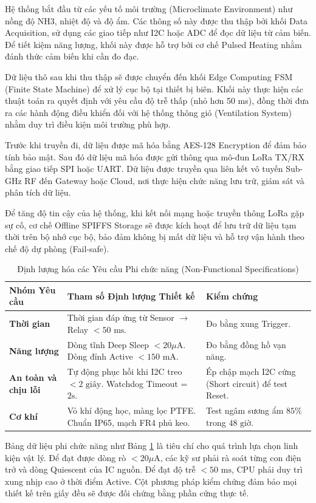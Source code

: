 Hệ thống bắt đầu từ các yếu tố môi trường (Microclimate Environment) như nồng độ NH3, nhiệt độ và độ ẩm. Các thông số này được thu thập bởi khối Data Acquisition, sử dụng các giao tiếp như I2C hoặc ADC để đọc dữ liệu từ cảm biến. Để tiết kiệm năng lượng, khối này được hỗ trợ bởi cơ chế Pulsed Heating nhằm đánh thức cảm biến khi cần đo đạc.

Dữ liệu thô sau khi thu thập sẽ được chuyển đến khối Edge Computing FSM (Finite State Machine) để xử lý cục bộ tại thiết bị biên. Khối này thực hiện các thuật toán ra quyết định với yêu cầu độ trễ thấp (nhỏ hơn 50 ms), đồng thời đưa ra các hành động điều khiển đối với hệ thống thông gió (Ventilation System) nhằm duy trì điều kiện môi trường phù hợp.

Trước khi truyền đi, dữ liệu được mã hóa bằng AES-128 Encryption để đảm bảo tính bảo mật. Sau đó dữ liệu mã hóa được gửi thông qua mô-đun LoRa TX/RX bằng giao tiếp SPI hoặc UART. Dữ liệu được truyền qua liên kết vô tuyến Sub-GHz RF đến Gateway hoặc Cloud, nơi thực hiện chức năng lưu trữ, giám sát và phân tích dữ liệu.

Để tăng độ tin cậy của hệ thống, khi kết nối mạng hoặc truyền thông LoRa gặp sự cố, cơ chế Offline SPIFFS Storage sẽ được kích hoạt để lưu trữ dữ liệu tạm thời trên bộ nhớ cục bộ, bảo đảm không bị mất dữ liệu và hỗ trợ vận hành theo chế độ dự phòng (Fail-safe).

\begin{table}[H]
\centering
\caption{Định lượng hóa các Yêu cầu Phi chức năng (Non-Functional Specifications)}
\label{Bảng 3.1}
\renewcommand{\arraystretch}{1.5}
\begin{tabular}{p{4.0cm} p{6.5cm} p{4cm}}
\hline
\textbf{Nhóm Yêu cầu} & \textbf{Tham số Định lượng Thiết kế} & \textbf{Kiểm chứng } \\ \hline
\textbf{ Thời gian } & Thời gian đáp ứng từ Sensor $\rightarrow$ Relay $< 50\text{ ms}$. & Đo bằng xung Trigger. \\ 
\textbf{Năng lượng} & Dòng tĩnh Deep Sleep $< 20\mu\text{A}$. Dòng đỉnh Active $< 150\text{ mA}$. & Đo bằng đồng hồ vạn năng. \\ 
\textbf{An toàn và chịu lỗi} & Tự động phục hồi khi I2C treo $< 2\text{ giây}$. Watchdog Timeout = $2\text{s}$. & Ép chập mạch I2C cứng (Short circuit) để test Reset. \\ 
\textbf{Cơ khí} & Vỏ khí động học, màng lọc PTFE. Chuẩn IP65, mạch FR4 phủ keo. & Test ngâm sương ẩm $85\%$ trong $48\text{ giờ}$. \\ \hline
\end{tabular}
\end{table}
Bảng dữ liệu phi chức năng như Bảng \ref{Bảng 3.1} là tiêu chí cho quá trình lựa chọn linh kiện vật lý. Để đạt được dòng rò $< 20\mu\text{A}$, các kỹ sư phải rà soát từng con điện trở và dòng Quiescent của IC nguồn. Để đạt độ trễ $< 50\text{ ms}$, CPU phải duy trì xung nhịp cao ở thời điểm Active. Cột phương pháp kiểm chứng đảm bảo mọi thiết kế trên giấy đều sẽ được đối chứng bằng phần cứng thực tế.
